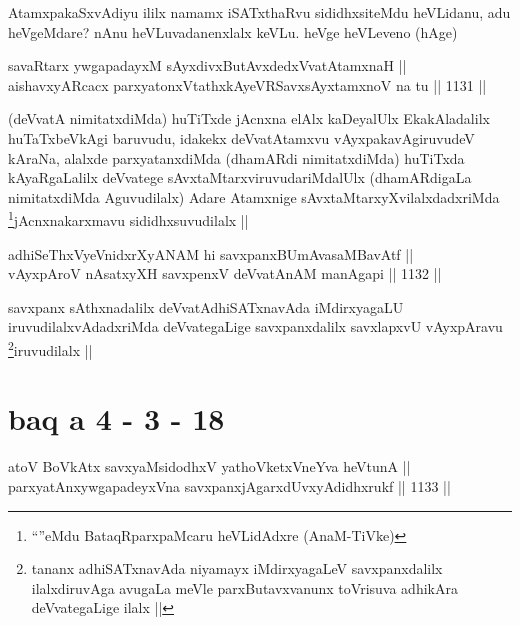 \begin{artha}
AtamxpakaSxvAdiyu ililx namamx iSATxthaRvu sididhxsiteMdu heVLidanu, adu heVgeMdare? nAnu heVLuvadanenxlalx keVLu. heVge heVLeveno (hAge) 
\end{artha}

\begin{shl}
savaRtarx ywgapadayxM sAyxdivxButAvxdedxVvatAtamxnaH || \\
aishavxyARcacx parxyatonxVtathxkAyeVRSavxsAyx\s \s tamxnoV na tu ||  1131 ||  
\end{shl}

\begin{artha}
(deVvatA nimitatxdiMda) huTiTxde jAcnxna elAlx kaDeyalUlx EkakAladalilx huTaTxbeVkAgi baruvudu, idakekx deVvatAtamxvu vAyxpakavAgiruvudeV kAraNa, alalxde parxyatanxdiMda (dhamARdi nimitatxdiMda) huTiTxda kAyaRgaLalilx deVvatege sAvxtaMtarxviruvudariMdalUlx (dhamARdigaLa nimitatxdiMda Aguvudilalx) Adare Atamxnige sAvxtaMtarxyXvilalxdadxriMda \footnote{``\stext''eMdu BataqRparxpaMcaru heVLidAdxre (AnaM-TiVke)}jAcnxnakarxmavu sididhxsuvudilalx ||
\end{artha}


\begin{shl}
adhiSeThxVyeVnidxrXyANAM hi savxpanxBUmAvasaMBavAtf ||  \\
vAyxpAroV nAsatxyXH savxpenxV deVvatAnAM manAgapi ||  1132 ||  
\end{shl}

\begin{artha}
savxpanx sAthxnadalilx deVvatAdhiSATxnavAda iMdirxyagaLU iruvudilalxvAdadxriMda deVvategaLige savxpanxdalilx savxlapxvU vAyxpAravu \footnote{tananx adhiSATxnavAda niyamayx iMdirxyagaLeV savxpanxdalilx ilalxdiruvAga avugaLa meVle parxButavxvanunx toVrisuva adhikAra deVvategaLige ilalx ||}iruvudilalx ||
\end{artha}

\section*{baq a 4 - 3 - 18}


\begin{shl}
atoV BoVkAtx savxyaMsidodhxV yathoVketxVneYva heVtunA || \\
parxyatAnxywgapadeyxVna savxpanxjAgarxdUvxyAdidhxrukf ||  1133 ||  
\end{shl}

